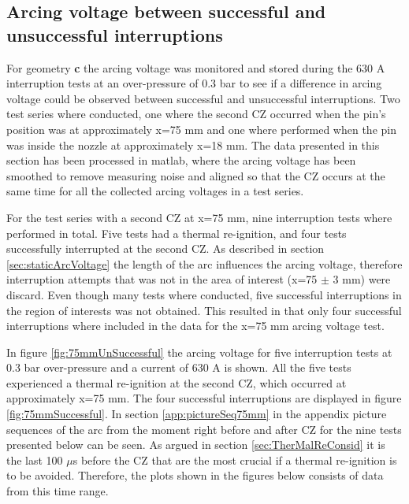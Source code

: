 \documentclass[10pt,b5paper,twoside]{article}
\begin{document}
\newpage
\subsection{Arcing voltage between successful and unsuccessful interruptions}
For geometry \textbf{c} the arcing voltage was monitored and stored during the 630 A interruption tests at an over-pressure of 0.3 bar to see if a difference in arcing voltage could be observed between successful and unsuccessful interruptions. Two test series where conducted, one where the second CZ occurred when the pin's position was at approximately x=75 mm and one where performed when the pin was inside the nozzle at approximately x=18 mm. The data presented in this section has been processed in matlab, where the arcing voltage has been smoothed to remove measuring noise and aligned so that the CZ occurs at the same time for all the collected arcing voltages in a test series. 

For the test series with a second CZ at x=75 mm, nine interruption tests where performed in total. Five tests had a thermal re-ignition, and four tests successfully interrupted at the second CZ. As described in section \ref{sec:staticArcVoltage} the length of the arc influences the arcing voltage, therefore interruption attempts that was not in the area of interest (x=75 $\pm$ 3 mm) were discard. Even though many tests where conducted, five successful interruptions in the region of interests was not obtained. This resulted in that only four successful interruptions where included in the data for the x=75 mm arcing voltage test.

In figure \ref{fig:75mmUnSuccessful} the arcing voltage for five interruption tests at 0.3 bar over-pressure and a current of 630 A is shown. All the five tests experienced a thermal re-ignition at the second CZ, which occurred at approximately  x=75 mm. The four successful interruptions are displayed in figure \ref{fig:75mmSuccessful}. In section \ref{app:pictureSeq75mm} in the appendix picture sequences of the arc from the moment right before and after CZ for the nine tests presented below can be seen. As argued in section \ref{sec:TherMalReConsid} it is the last 100 $\mu$s before the CZ that are the most crucial if a thermal re-ignition is to be avoided. Therefore, the plots shown in the figures below consists of data from this time range. 
\end{document}
